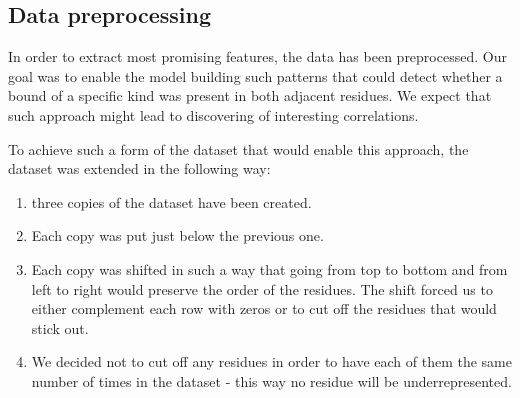 \documentclass[a4paper,10pt]{report}
\begin{document}
	    


	\subsection{Data preprocessing}\label{sec:data_processing}
	  In order to extract most promising features, the data has been preprocessed. Our goal was to enable the model building such patterns that could detect whether a bound of a specific kind was present in both adjacent residues. We expect that such approach might lead to discovering of interesting correlations. 
	  
	  To achieve such a form of the dataset that would enable this approach, the dataset was extended in the following way:
	  \begin{enumerate}
	   \item three copies of the dataset have been created.
	   \item Each copy was put just below the previous one. 
	   \item Each copy was shifted in such a way that going from top to bottom and from left to right would preserve the order of the residues. The shift forced us to either complement each row with zeros or to cut off the residues that would stick out.
	   \item We decided not to cut off any residues in order to have each of them the same number of times in the dataset - this way no residue will be underrepresented.
	  \end{enumerate}
\end{document}
